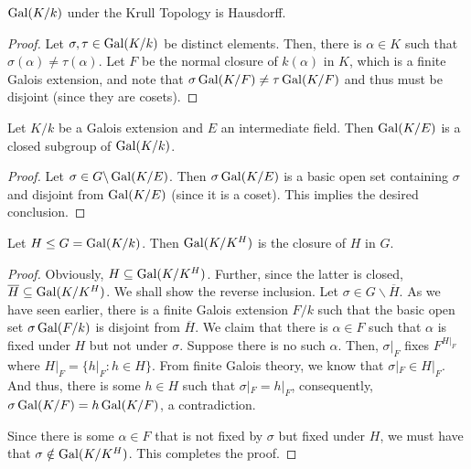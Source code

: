 \begin{proposition}
    $\operatorname{Gal}(K/k)$ under the Krull Topology is Hausdorff.
\end{proposition}
\begin{proof}
    Let $\sigma,\tau\in\operatorname{Gal}(K/k)$ be distinct elements. Then, there is $\alpha\in K$ such that $\sigma(\alpha)\ne\tau(\alpha)$. Let $F$ be the normal closure of $k(\alpha)$ in $K$, which is a finite Galois extension, and note that $\sigma\operatorname{Gal}(K/F)\ne\tau\operatorname{Gal}(K/F)$ and thus must be disjoint (since they are cosets).  
\end{proof}

\begin{proposition}
    Let $K/k$ be a Galois extension and $E$ an intermediate field. Then $\operatorname{Gal}(K/E)$ is a closed subgroup of $\operatorname{Gal}(K/k)$.
\end{proposition}
\begin{proof}
    Let $\sigma\in G\backslash\operatorname{Gal}(K/E)$. Then $\sigma\operatorname{Gal}(K/E)$ is a basic open set containing $\sigma$ and disjoint from $\operatorname{Gal}(K/E)$ (since it is a coset). This implies the desired conclusion.
\end{proof}

\begin{proposition}
    Let $H\le G = \operatorname{Gal}(K/k)$. Then $\operatorname{Gal}(K/K^H)$ is the closure of $H$ in $G$.
\end{proposition}
\begin{proof}
    Obviously, $H\subseteq\operatorname{Gal}(K/K^H)$. Further, since the latter is closed, $\overline{H}\subseteq\operatorname{Gal}(K/K^H)$. We shall show the reverse inclusion. Let $\sigma\in G\backslash\overline H$. As we have seen earlier, there is a finite Galois extension $F/k$ such that the basic open set $\sigma\operatorname{Gal}(F/k)$ is disjoint from $\overline H$. We claim that there is $\alpha\in F$ such that $\alpha$ is fixed under $H$ but not under $\sigma$. Suppose there is no such $\alpha$. Then, $\sigma|_F$ fixes $F^{H\vert_F}$ where $H\vert_F = \{h\vert_F : h\in H\}$. From finite Galois theory, we know that $\sigma|_F\in H|_F$. And thus, there is some $h\in H$ such that $\sigma|_F = h|_F$, consequently, $\sigma\operatorname{Gal}(K/F) = h\operatorname{Gal}(K/F)$, a contradiction. 

    Since there is some $\alpha\in F$ that is not fixed by $\sigma$ but fixed under $H$, we must have that $\sigma\notin\operatorname{Gal}(K/K^H)$. This completes the proof.
\end{proof}

